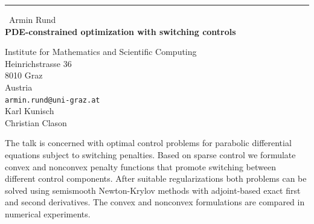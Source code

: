 \documentclass{report}
\begin{document}
\begin{center}
\rule{6in}{1pt} \
{\large Armin Rund \\
{\bf PDE-constrained optimization with switching controls}}

Institute for Mathematics and Scientific Computing \\ Heinrichstrasse 36 \\ 8010 Graz \\ Austria
\\
{\tt armin.rund@uni-graz.at}\\
Karl Kunisch\\
Christian Clason\end{center}

The talk is concerned with optimal control problems for parabolic
differential equations subject to switching penalties. Based on sparse
control we formulate convex and nonconvex penalty functions that promote
switching between different control components. After suitable
regularizations both problems can be solved using semismooth
Newton-Krylov methods with adjoint-based exact first and second
derivatives. The convex and nonconvex formulations are compared in
numerical experiments.
\end{document}
